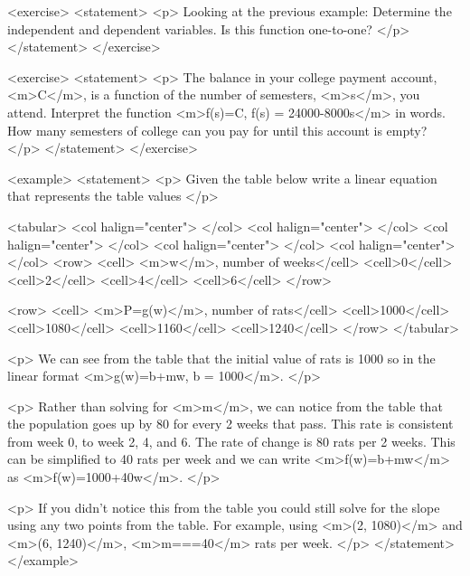     <exercise>
        <statement>
            <p>
                Looking at the previous example: Determine the independent and dependent variables.
                Is this function one-to-one?
            </p>
        </statement>
    </exercise>

    <exercise>
        <statement>
            <p>
                The balance in your college payment account, <m>C</m>, is a function of the number of semesters, <m>s</m>, you attend.
                Interpret the function <m>f(s)=C, f(s) = 24000-8000s</m> in words.
                How many semesters of college can you pay for until this account is empty?
            </p>
        </statement>
    </exercise>

    <example>
        <statement>
            <p>
                Given the table below write a linear equation that represents the table values
            </p>

            <tabular>
                <col halign="center"> </col> <col halign="center"> </col> <col halign="center"> </col> <col halign="center"> </col> <col halign="center"> </col>
                <row>
                    <cell> <m>w</m>, number of weeks</cell>
                    <cell>0</cell>
                    <cell>2</cell>
                    <cell>4</cell>
                    <cell>6</cell>
                </row>

                <row>
                    <cell> <m>P=g(w)</m>, number of rats</cell>
                    <cell>1000</cell>
                    <cell>1080</cell>
                    <cell>1160</cell>
                    <cell>1240</cell>
                </row>
            </tabular>

            <p>
                We can see from the table that the initial value of rats is 1000 so in the linear format <m>g(w)=b+mw, b = 1000</m>.
            </p>

            <p>
                Rather than solving for <m>m</m>, we can notice from the table that the population goes up by 80 for every 2 weeks that pass.
                This rate is consistent from week 0, to week 2, 4, and 6.
                The rate of change is 80 rats per 2 weeks.
                This can be simplified to 40 rats per week and we can write <m>f(w)=b+mw</m> as <m>f(w)=1000+40w</m>.
            </p>

            <p>
                If you didn’t notice this from the table you could still solve for the slope using any two points from the table.
                For example, using <m>(2, 1080)</m> and <m>(6, 1240)</m>, <m>m===40</m> rats per week.
            </p>
        </statement>
    </example>

